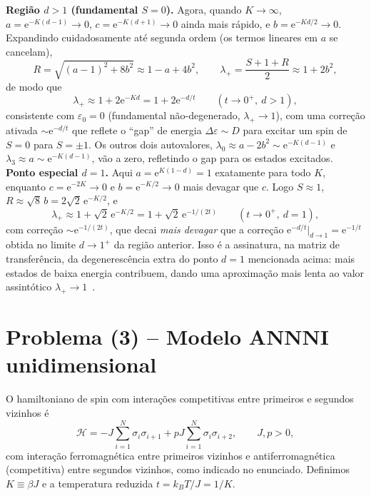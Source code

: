 \documentclass[11pt,a4paper]{article}
\newcommand{\e}[1]{\mathrm{e}^{#1}}
\begin{document}
%
\medskip
\noindent\textbf{Região $d>1$ (fundamental $S=0$).} Agora, quando $K\to\infty$, $a=\e{-K(d-1)}\to0$, $c=\e{-K(d+1)}\to0$ ainda mais rápido, e $b=\e{-Kd/2}\to0$. Expandindo cuidadosamente até segunda ordem (os termos lineares em $a$ se cancelam),
%
\begin{equation}
    R=\sqrt{(a-1)^2+8b^2}\approx1-a+4b^2,
    \qquad
    \lambda_+=\frac{S+1+R}{2}\approx1+2b^2,
\end{equation}
%
de modo que
%
\begin{equation}
    \boxed{
    \lambda_+\approx1+2\e{-Kd}=1+2\e{-d/t}
    \qquad(t\to0^+,\ d>1),
    }
\end{equation}
%
consistente com $\varepsilon_0=0$ (fundamental não-degenerado, $\lambda_+\to1$), com uma correção ativada $\sim\e{-d/t}$ que reflete o ``gap'' de energia $\Delta\varepsilon\sim D$ para excitar um spin de $S=0$ para $S=\pm1$. Os outros dois autovalores, $\lambda_0\approx a-2b^2\sim\e{-K(d-1)}$ e $\lambda_3\approx a\sim\e{-K(d-1)}$, vão a zero, refletindo o gap para os estados excitados.
%
\medskip
\noindent\textbf{Ponto especial $d=1$.} Aqui $a=\e{K(1-d)}=1$ exatamente para todo $K$, enquanto $c=\e{-2K}\to0$ e $b=\e{-K/2}\to0$ mais devagar que $c$. Logo $S\approx1$, $R\approx\sqrt{8}\,b=2\sqrt2\,\e{-K/2}$, e
%
\begin{equation}
    \boxed{
    \lambda_+\approx1+\sqrt2\,\e{-K/2}=1+\sqrt2\,\e{-1/(2t)}
    \qquad(t\to0^+,\ d=1),
    }
\end{equation}
%
com correção $\sim\e{-1/(2t)}$, que decai \emph{mais devagar} que a correção $\e{-d/t}\big|_{d\to1}=\e{-1/t}$ obtida no limite $d\to1^+$ da região anterior. Isso é a assinatura, na matriz de transferência, da degenerescência extra do ponto $d=1$ mencionada acima: mais estados de baixa energia contribuem, dando uma aproximação mais lenta ao valor assintótico $\lambda_+\to1$~\cite{krinsky}.
\section*{Problema (3) -- Modelo ANNNI unidimensional}
%
O hamiltoniano de spin com interações competitivas entre primeiros e segundos vizinhos é
%
\begin{equation}
    \mathcal H=-J\sum_{i=1}^N\sigma_i\sigma_{i+1}+pJ\sum_{i=1}^N\sigma_i\sigma_{i+2},
    \qquad J,p>0,
    \label{eq:H_annni}
\end{equation}
%
com interação ferromagnética entre primeiros vizinhos e antiferromagnética (competitiva) entre segundos vizinhos, como indicado no enunciado. Definimos $K\equiv\beta J$ e a temperatura reduzida $t=k_BT/J=1/K$.
%
\end{document}
